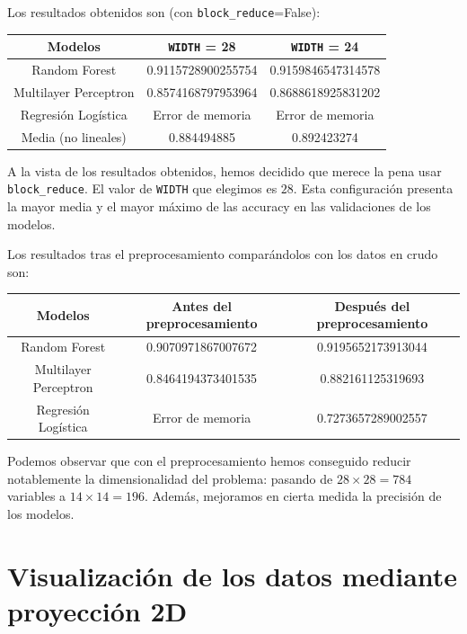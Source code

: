 \documentclass[a4]{article}
\begin{document}
Los resultados obtenidos son (con \texttt{block\_reduce}=False):

\begin{center}
\begin{tabular}{|c|c|c|}
\hline
\multicolumn{1}{|c|}{Modelos}& \textbf{\texttt{WIDTH} = 28} &
\textbf{\texttt{WIDTH} = 24}  \\ \hline
  Random Forest         & 0.9115728900255754 & 0.9159846547314578 \\
  Multilayer Perceptron & 0.8574168797953964 & 0.8688618925831202 \\
  Regresión Logística   & Error de memoria   & Error de memoria \\
  Media (no lineales) & 0.884494885 & 0.892423274 \\ \hline
\end{tabular}
\end{center}

A la vista de los resultados obtenidos, hemos decidido que merece la
pena usar \texttt{block\_reduce}. El valor de \texttt{WIDTH} que
elegimos es $28$. Esta configuración presenta la mayor media y el
mayor máximo de las accuracy en las validaciones de los modelos.

Los resultados tras el preprocesamiento comparándolos con los datos en crudo son:
\begin{center}
\begin{tabular}{|c|c|c|}
  \hline
  \multicolumn{1}{|c|}{Modelos}& \textbf{Antes del preprocesamiento} &
                                                                       \textbf{Después del preprocesamiento}  \\ \hline
  Random Forest         & 0.9070971867007672 & 0.9195652173913044 \\
  Multilayer Perceptron & 0.8464194373401535 & 0.882161125319693 \\
  Regresión Logística   & Error de memoria   & 0.7273657289002557 \\ \hline
\end{tabular}
\end{center}

Podemos observar que con el preprocesamiento hemos conseguido reducir
notablemente la dimensionalidad del problema: pasando de
$28\times 28=784$ variables a $14\times 14=196$. Además, mejoramos en
cierta medida la precisión de los modelos.

\section{Visualización de los datos mediante proyección 2D}
\end{document}

